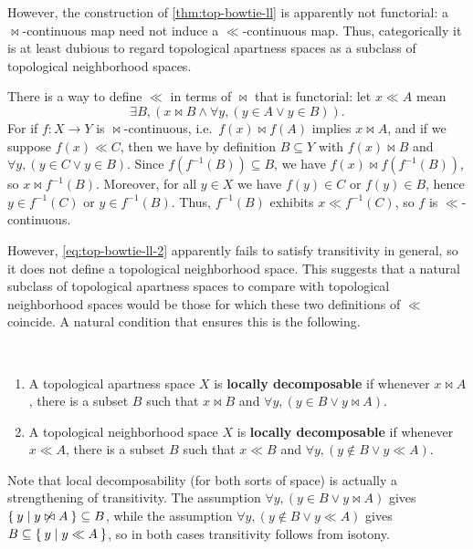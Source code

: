 \documentclass{article}
\def\inv{^{-1}}
\begin{document}
However, the construction of \cref{thm:top-bowtie-ll} is apparently not functorial: a $\bowtie$-continuous map need not induce a $\ll$-continuous map.
Thus, categorically it is at least dubious to regard topological apartness spaces as a subclass of topological neighborhood spaces.

There is a way to define $\ll$ in terms of $\bowtie$ that is functorial: let $x\ll A$ mean
\begin{equation}
  \exists B, (x\bowtie B \land \forall y, (y\in A \lor y\in B)).\label{eq:top-bowtie-ll-2}
\end{equation}
For if $f:X\to Y$ is $\bowtie$-continuous, i.e.\ $f(x)\bowtie f(A)$ implies $x\bowtie A$, and if we suppose $f(x)\ll C$, then we have by definition $B\subseteq Y$ with $f(x)\bowtie B$ and $\forall y, (y\in C \lor y\in B)$.
Since $f(f\inv(B))\subseteq B$, we have $f(x)\bowtie f(f\inv(B))$, so $x\bowtie f\inv(B)$.
Moreover, for all $y\in X$ we have $f(y)\in C$ or $f(y)\in B$, hence $y\in f\inv(C)$ or $y\in f\inv(B)$.
Thus, $f\inv(B)$ exhibits $x\ll f\inv(C)$, so $f$ is $\ll$-continuous.

However, \eqref{eq:top-bowtie-ll-2} apparently fails to satisfy transitivity in general, so it does not define a topological neighborhood space.
This suggests that a natural subclass of topological apartness spaces to compare with topological neighborhood spaces would be those for which these two definitions of $\ll$ coincide.
A natural condition that ensures this is the following.

\begin{defn}\ 
  \begin{enumerate}
  \item A topological apartness space $X$ is \textbf{locally decomposable} if whenever $x\bowtie A$, there is a subset $B$ such that $x\bowtie B$ and $\forall y, (y\in B \lor y\bowtie A)$.
  \item A topological neighborhood space $X$ is \textbf{locally decomposable} if whenever $x\ll A$, there is a subset $B$ such that $x\ll B$ and $\forall y, (y\notin B \lor y \ll A)$.
  \end{enumerate}
\end{defn}

Note that local decomposability (for both sorts of space) is actually a strengthening of transitivity.
The assumption $\forall y, (y\in B \lor y\bowtie A)$ gives $\Set{y|y\not\bowtie A} \subseteq B$, while the assumption $\forall y, (y\notin B \lor y \ll A)$ gives $B\subseteq \Set{y|y\ll A}$, so in both cases transitivity follows from isotony.
\end{document}
